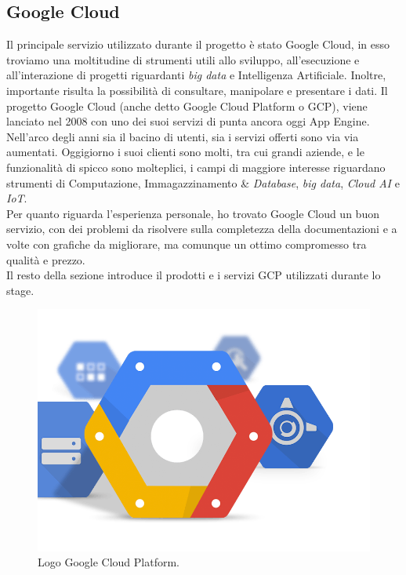 \subsection{Google Cloud}\label{GoogleCloud}
Il principale servizio utilizzato durante il progetto è stato Google Cloud, in esso troviamo una moltitudine di strumenti utili allo sviluppo, all'esecuzione e all'interazione di progetti riguardanti \emph{big data} e Intelligenza Artificiale. Inoltre, importante risulta la possibilità di consultare, manipolare e presentare i dati.
Il progetto Google Cloud (anche detto Google Cloud Platform o GCP), viene lanciato nel 2008 con uno dei suoi servizi di punta ancora oggi  \Gls{App Engine}. Nell'arco degli anni sia il bacino di utenti, sia i servizi offerti sono via via aumentati. Oggigiorno i suoi clienti \cite{clienti} sono molti, tra cui grandi aziende, e le funzionalità di spicco sono molteplici, i campi di maggiore interesse riguardano strumenti di Computazione, Immagazzinamento \& \emph{Database}, \emph{big data}, \emph{Cloud AI} e \emph{IoT}.
\\
Per quanto riguarda l'esperienza personale, ho trovato Google Cloud un buon servizio, con dei problemi da risolvere sulla completezza della documentazioni e a volte con grafiche da migliorare, ma comunque un ottimo compromesso tra qualità e prezzo.
\\
Il resto della sezione introduce il prodotti e i servizi GCP utilizzati durante lo stage.
\begin{figure}[h!]
	\centering
	\includegraphics[scale=0.3]{figures/google-cloud-platform}
	\caption[Logo Google Cloud Platform.]{Logo Google Cloud Platform.
		\label{fig:logoGCP}}
\end{figure}	
